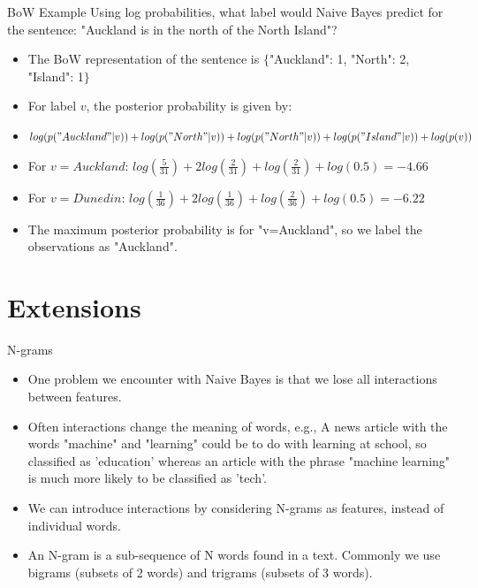\documentclass[aspectratio=169, 10pt]{beamer}
\begin{document}
\begin{frame}{BoW Example}
    Using log probabilities, what label would Naive Bayes predict for the sentence: "Auckland is in the north of the North Island"?
    \pause
    \begin{itemize}
        \item The BoW representation of the sentence is $\{$"Auckland": 1, "North": 2, "Island": 1$\}$
        \item For label $v$, the posterior probability is given by:
        \item $log(p("Auckland"|v)) + log(p("North"|v)) + log(p("North"|v)) + log(p("Island"|v)) + log(p(v))$
        \pause
        \item For $v=Auckland$: $log(\frac{5}{31}) + 2log(\frac{2}{31}) + log(\frac{2}{31}) + log(0.5) = -4.66$
        \item For $v=Dunedin$: $log(\frac{1}{36}) + 2log(\frac{1}{36}) + log(\frac{2}{36}) + log(0.5) = -6.22$
        \item The maximum posterior probability is for "v=Auckland", so we label the observations as "Auckland".
    \end{itemize}
\end{frame}
    
\section{Extensions}
\begin{frame}{N-grams}
\begin{itemize}
    \item One problem we encounter with Naive Bayes is that we lose all interactions between features.
    \item Often interactions change the meaning of words, e.g., A news article with the words "machine" and "learning" could be to do with learning at school, so classified as 'education' whereas an article with the phrase "machine learning" is much more likely to be classified as 'tech'.
    \item We can introduce interactions by considering N-grams as features, instead of individual words.
    \item An N-gram is a sub-sequence of N words found in a text. Commonly we use bigrams (subsets of 2 words) and trigrams (subsets of 3 words).
\end{itemize}
\end{frame}
\end{document}
